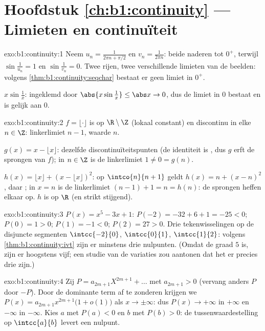 \section*{Hoofdstuk \ref{ch:b1:continuity} --- Limieten en continuïteit}

\begin{solution}{exo:b1:continuity:1}
Neem $u_n = \frac{1}{2\pi n + \pi/2}$ en $v_n = \frac{1}{2\pi n}$:
beide naderen tot $0^+$, terwijl $\sin\frac{1}{u_n} = 1$ en
$\sin\frac{1}{v_n} = 0$. Twee rijen, twee verschillende limieten van
de beelden: volgens \cref{thm:b1:continuity:seqchar} bestaat er geen
limiet in $0^+$.

$x \sin\frac1x$: ingeklemd door $\abs{x\sin\frac1x} \leq \abs x \to
0$, dus de limiet in $0$ bestaat en is gelijk aan $0$.
\end{solution}

\begin{solution}{exo:b1:continuity:2}
$f = \lfloor\cdot\rfloor$ is  op $\R \setminus \Z$ (lokaal
constant) en discontinu in elke $n \in \Z$: linkerlimiet $n - 1$,
waarde $n$.

$g(x) = x - \lfloor x\rfloor$: dezelfde discontinuïteitspunten (de
identiteit is , dus $g$ erft de sprongen van $f$); in $n \in
\Z$ is de linkerlimiet $1 \neq 0 = g(n)$.

$h(x) = \lfloor x\rfloor + (x - \lfloor x\rfloor)^2$: op $\intco{n}{n
+ 1}$ geldt $h(x) = n + (x - n)^2$, daar ; in $x = n$ is de
linkerlimiet $(n-1) + 1 = n = h(n)$: de sprongen heffen elkaar op.
$h$ is  op $\R$ (en strikt stijgend).
\end{solution}

\begin{solution}{exo:b1:continuity:3}
$P(x) = x^5 - 3x + 1$: $P(-2) = -32 + 6 + 1 = -25 < 0$; $P(0) = 1 >
0$; $P(1) = -1 < 0$; $P(2) = 27 > 0$. Drie tekenwisselingen op de
disjuncte segmenten $\intcc{-2}{0}$, $\intcc{0}{1}$, $\intcc{1}{2}$:
volgens \cref{thm:b1:continuity:ivt} zijn er minstens drie
nulpunten. (Omdat de graad $5$ is, zijn er hoogstens vijf; een
studie van de variaties zou aantonen dat het er precies drie zijn.)
\end{solution}

\begin{solution}{exo:b1:continuity:4}
Zij $P = a_{2m+1}X^{2m+1} + \dots$ met $a_{2m+1} > 0$ (vervang
anders $P$ door $-P$). Door de dominante term af te zonderen krijgen
we $P(x) = a_{2m+1} x^{2m+1}\bigl(1 + o(1)\bigr)$ als $x \to
\pm\infty$: dus $P(x) \to +\infty$ in $+\infty$ en $-\infty$ in
$-\infty$. Kies $a$ met $P(a) < 0$ en $b$ met $P(b) > 0$: de
tussenwaardestelling op $\intcc{a}{b}$ levert een nulpunt.
\end{solution}

